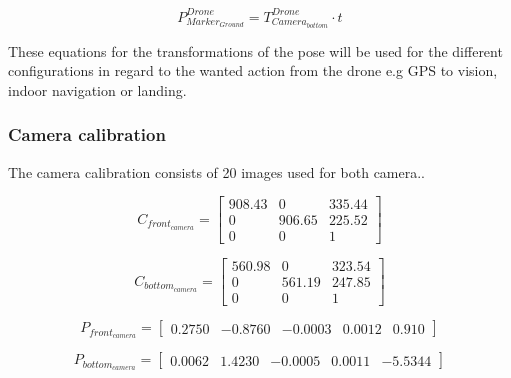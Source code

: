 \documentclass[../Head/report.tex]{subfiles}
\begin{document}
\begin{equation}
	P^{Drone}_{Marker_{Ground}} = T^{Drone}_{Camera_{bottom}} \cdot t 
	\label{eq:translation_drone2ground}  
\end{equation}

These equations for the transformations of the pose will be used for the different configurations in regard to the wanted action from the drone e.g GPS to vision, indoor navigation or landing.    

\subsubsection{Camera calibration}
The camera calibration consists of 20 images used for both camera..

\begin{minipage}{0.45\linewidth}
\begin{equation}
C_{front_{camera}} = \begin{bmatrix}
908.43 & 0 & 335.44\\
0 & 906.65 & 225.52\\
0 & 0 & 1
\end{bmatrix}
\end{equation}
\label{eq:camera_matrix_front}
\end{minipage}
\hspace*{\fill}
\begin{minipage}{0.45\linewidth}
\begin{equation}
C_{bottom_{camera}}  = \begin{bmatrix}
560.98 & 0 & 323.54\\
0 & 561.19 & 247.85\\
0 & 0 & 1
\end{bmatrix}
\end{equation}
\label{eq:camera_matrix_bottom}
\end{minipage}


\begin{equation}
P_{front_{camera}} = \begin{bmatrix}
0.2750 & -0.8760 & -0.0003 & 0.0012 & 0.910
\end{bmatrix}
\label{eq:distortion_coefficients_front}
\end{equation}

\begin{equation}
P_{bottom_{camera}} = \begin{bmatrix}
0.0062 & 1.4230 & -0.0005 & 0.0011 & -5.5344
\end{bmatrix}
\label{eq:distortion_coefficients_bottom}
\end{equation}
\end{document}
